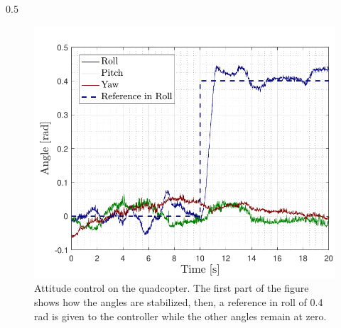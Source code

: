 \vspace{-2cm}
\begin{columns}[t,totalwidth=\twocolwid] %
		
		\begin{column}{0.5\twocolwid}%
  		\centering
			\begin{figure}
				\includegraphics[width=.9\linewidth]{figures/AttitudeControl}
				\caption{Attitude control on the quadcopter. The first part of the figure shows how the angles are stabilized, then, a reference in roll of 0.4 rad is given to the controller while the other angles remain at zero.}
			\end{figure}
		\end{column} %
		

\end{columns}
